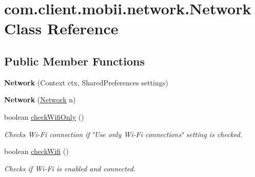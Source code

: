 \hypertarget{classcom_1_1client_1_1mobii_1_1network_1_1_network}{\section{com.\-client.\-mobii.\-network.\-Network Class Reference}
\label{classcom_1_1client_1_1mobii_1_1network_1_1_network}
}
\subsection*{Public Member Functions}
\begin{DoxyCompactItemize}
\item 
\hypertarget{classcom_1_1client_1_1mobii_1_1network_1_1_network_a286b627a06dc0fb63c5c4516f23b5664}{{\bfseries Network} (Context ctx, Shared\-Preferences settings)}\label{classcom_1_1client_1_1mobii_1_1network_1_1_network_a286b627a06dc0fb63c5c4516f23b5664}

\item 
\hypertarget{classcom_1_1client_1_1mobii_1_1network_1_1_network_a716a19675e18d2071719464b5e029a51}{{\bfseries Network} (\hyperlink{classcom_1_1client_1_1mobii_1_1network_1_1_network}{Network} n)}\label{classcom_1_1client_1_1mobii_1_1network_1_1_network_a716a19675e18d2071719464b5e029a51}

\item 
boolean \hyperlink{classcom_1_1client_1_1mobii_1_1network_1_1_network_a78e3e48a4c4e0be8744aca97d967c82f}{check\-Wifi\-Only} ()
\begin{DoxyCompactList}\small\item\em Checks Wi-\/\-Fi connection if {\itshape \char`\"{}\-Use only Wi-\/\-Fi connections\char`\"{}} setting is checked. \end{DoxyCompactList}\item 
boolean \hyperlink{classcom_1_1client_1_1mobii_1_1network_1_1_network_a5c6c2c5a433b0f30159a39c5ca915876}{check\-Wifi} ()
\begin{DoxyCompactList}\small\item\em Checks if Wi-\/\-Fi is enabled and connected. \end{DoxyCompactList}\end{DoxyCompactItemize}


